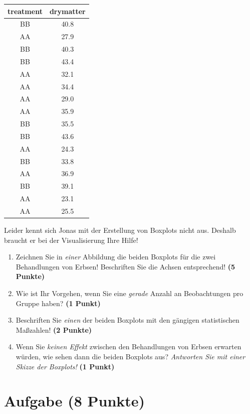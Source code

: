 \documentclass[a4paper, 9pt]{scrartcl}\usepackage[]{graphicx}\usepackage[]{xcolor}
\begin{document}
\begin{table}[!h]
\centering
\begin{tabular}{cc}
\toprule
treatment & drymatter\\
\midrule
BB & 40.8\\
AA & 27.9\\
BB & 40.3\\
BB & 43.4\\
AA & 32.1\\
\addlinespace
AA & 34.4\\
AA & 29.0\\
AA & 35.9\\
BB & 35.5\\
BB & 43.6\\
\addlinespace
AA & 24.3\\
BB & 33.8\\
AA & 36.9\\
BB & 39.1\\
AA & 23.1\\
\addlinespace
AA & 25.5\\
\bottomrule
\end{tabular}
\end{table}



Leider kennt sich Jonas mit der Erstellung von Boxplots nicht aus. Deshalb braucht er bei der Visualisierung Ihre Hilfe!

\begin{enumerate}
\item Zeichnen Sie in \textit{einer} Abbildung die beiden Boxplots für die zwei Behandlungen von Erbsen! Beschriften Sie die Achsen entsprechend! \textbf{(5 Punkte)} 
\item Wie ist Ihr Vorgehen, wenn Sie eine \textit{gerade} Anzahl an
  Beobachtungen pro Gruppe haben? \textbf{(1 Punkt)}
\item Beschriften Sie \textit{einen} der beiden Boxplots mit den gängigen
  statistischen Maßzahlen! \textbf{(2 Punkte)}
\item Wenn Sie \textit{keinen Effekt} zwischen den Behandlungen von
  Erbsen erwarten würden, wie sehen dann die beiden Boxplots aus?
  \textit{Antworten Sie mit einer Skizze der Boxplots!}
  \textbf{(1 Punkt)}
\end{enumerate} 
\clearpage

\section{Aufgabe \hfill (8 Punkte)}
\end{document}
